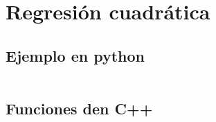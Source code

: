 \chapter{Regresión cuadrática}
\label{appendix:regresion_cuadratica}

\section{Ejemplo en python}
\inputminted{python}{apendices/regresion_cuadratica.py}

\section{Funciones den C++}

\inputminted{c++}{apendices/reg2.h}
